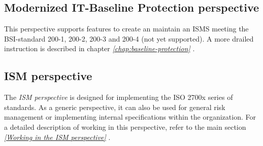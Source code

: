 \documentclass[a4paper,10pt]{book}
\begin{document}
\subsection{Modernized IT-Baseline Protection perspective}
This perspective supports features to create an maintain an ISMS meeting the
BSI-standard 200-1, 200-2, 200-3 and 200-4 (not yet supported).  A more drailed
instruction is described in chapter \emph{\ref{chap:baseline-protection}
}.

\subsection{ISM perspective}
The {\em ISM perspective} is designed for implementing the ISO 2700x series of standards. As a generic perspective,
it can also be used for general risk management or implementing internal specifications within the organization.
For a detailed description of working in this perspective, refer to the main section
{\em \ref{Working in the ISM perspective} }.
\end{document}
